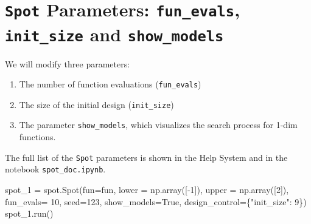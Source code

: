 \documentclass[
  letterpaper,
  DIV=11,
  numbers=noendperiod]{scrreprt}
\newenvironment{Shaded}{\begin{snugshade}}{\end{snugshade}}
\newcommand{\DecValTok}[1]{\textcolor[rgb]{0.68,0.00,0.00}{#1}}
\newcommand{\NormalTok}[1]{\textcolor[rgb]{0.00,0.23,0.31}{#1}}
\newcommand{\OperatorTok}[1]{\textcolor[rgb]{0.37,0.37,0.37}{#1}}
\newcommand{\StringTok}[1]{\textcolor[rgb]{0.13,0.47,0.30}{#1}}
\newcommand{\VariableTok}[1]{\textcolor[rgb]{0.07,0.07,0.07}{#1}}
\providecommand{\tightlist}{%
  \setlength{\itemsep}{0pt}\setlength{\parskip}{0pt}}\usepackage{longtable,booktabs,array}
\begin{document}
\hypertarget{spot-parameters-fun_evals-init_size-and-show_models}{%
\section{\texorpdfstring{\texttt{Spot} Parameters: \texttt{fun\_evals},
\texttt{init\_size} and
\texttt{show\_models}}{Spot Parameters: fun\_evals, init\_size and show\_models}}\label{spot-parameters-fun_evals-init_size-and-show_models}}

We will modify three parameters:

\begin{enumerate}
\def\labelenumi{\arabic{enumi}.}
\tightlist
\item
  The number of function evaluations (\texttt{fun\_evals})
\item
  The size of the initial design (\texttt{init\_size})
\item
  The parameter \texttt{show\_models}, which visualizes the search
  process for 1-dim functions.
\end{enumerate}

The full list of the \texttt{Spot} parameters is shown in the Help
System and in the notebook \texttt{spot\_doc.ipynb}.

\begin{Shaded}
\begin{Highlighting}[]
\NormalTok{spot\_1 }\OperatorTok{=}\NormalTok{ spot.Spot(fun}\OperatorTok{=}\NormalTok{fun,}
\NormalTok{                   lower }\OperatorTok{=}\NormalTok{ np.array([}\OperatorTok{{-}}\DecValTok{1}\NormalTok{]),}
\NormalTok{                   upper }\OperatorTok{=}\NormalTok{ np.array([}\DecValTok{2}\NormalTok{]),}
\NormalTok{                   fun\_evals}\OperatorTok{=} \DecValTok{10}\NormalTok{,}
\NormalTok{                   seed}\OperatorTok{=}\DecValTok{123}\NormalTok{,}
\NormalTok{                   show\_models}\OperatorTok{=}\VariableTok{True}\NormalTok{,}
\NormalTok{                   design\_control}\OperatorTok{=}\NormalTok{\{}\StringTok{"init\_size"}\NormalTok{: }\DecValTok{9}\NormalTok{\})}
\NormalTok{spot\_1.run()}
\end{Highlighting}
\end{Shaded}
\end{document}
